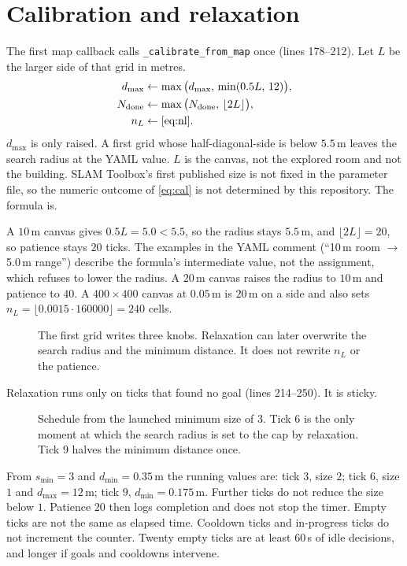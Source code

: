 \documentclass[11pt]{article}
\begin{document}
\section{Calibration and relaxation}
The first map callback calls \texttt{\_calibrate\_from\_map} once (lines 178--212). Let $L$ be the larger side of that grid in metres.
\begin{align}
d_{\max} &\leftarrow \max\big(d_{\max},\,\min(0.5 L,\,12)\big), \nonumber\\
N_{\mathrm{done}} &\leftarrow \max\big(N_{\mathrm{done}},\,\lfloor 2L\rfloor\big), \nonumber\\
n_L &\leftarrow \eqref{eq:nl}.
\label{eq:cal}
\end{align}
$d_{\max}$ is only raised. A first grid whose half-diagonal-side is below $5.5$\,m leaves the search radius at the YAML value. $L$ is the canvas, not the explored room and not the building. SLAM Toolbox's first published size is not fixed in the parameter file, so the numeric outcome of \eqref{eq:cal} is not determined by this repository. The formula is.

A $10$\,m canvas gives $0.5L=5.0<5.5$, so the radius stays $5.5$\,m, and $\lfloor 2L\rfloor=20$, so patience stays $20$ ticks. The examples in the YAML comment (``10\,m room $\rightarrow$ 5.0\,m range'') describe the formula's intermediate value, not the assignment, which refuses to lower the radius. A $20$\,m canvas raises the radius to $10$\,m and patience to $40$. A $400\times 400$ canvas at $0.05$\,m is $20$\,m on a side and also sets $n_L=\lfloor 0.0015\cdot 160000\rfloor=240$ cells.

\begin{figure}[ht]
\centering
\FigInteraction
\caption{The first grid writes three knobs. Relaxation can later overwrite the search radius and the minimum distance. It does not rewrite $n_L$ or the patience.}
\label{fig:ix}
\end{figure}

Relaxation runs only on ticks that found no goal (lines 214--250). It is sticky.

\begin{figure}[ht]
\centering
\FigRelax
\caption{Schedule from the launched minimum size of 3. Tick 6 is the only moment at which the search radius is set to the cap by relaxation. Tick 9 halves the minimum distance once.}
\label{fig:relax}
\end{figure}

From $s_{\min}=3$ and $d_{\min}=0.35$\,m the running values are: tick $3$, size $2$; tick $6$, size $1$ and $d_{\max}=12$\,m; tick $9$, $d_{\min}=0.175$\,m. Further ticks do not reduce the size below $1$. Patience $20$ then logs completion and does not stop the timer. Empty ticks are not the same as elapsed time. Cooldown ticks and in-progress ticks do not increment the counter. Twenty empty ticks are at least $60$\,s of idle decisions, and longer if goals and cooldowns intervene.
\end{document}
